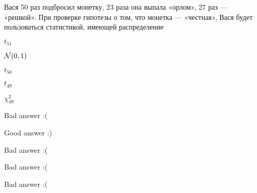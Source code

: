 
\begin{question}
Вася 50 раз подбросил монетку, 23 раза она выпала «орлом», 27 раз ---
«решкой». При проверке гипотезы о том, что монетка — «честная», Вася
будет пользоваться статистикой, имеющей распределение
\begin{answerlist}
  \item \(t_{51}\)
  \item \(\mathcal{N}(0,1)\)
  \item \(t_{50}\)
  \item \(t_{49}\)
  \item \(\chi^2_{49}\)
\end{answerlist}
\end{question}

\begin{solution}
\begin{answerlist}
  \item Bad answer :(
  \item Good answer :)
  \item Bad answer :(
  \item Bad answer :(
  \item Bad answer :(
\end{answerlist}
\end{solution}

